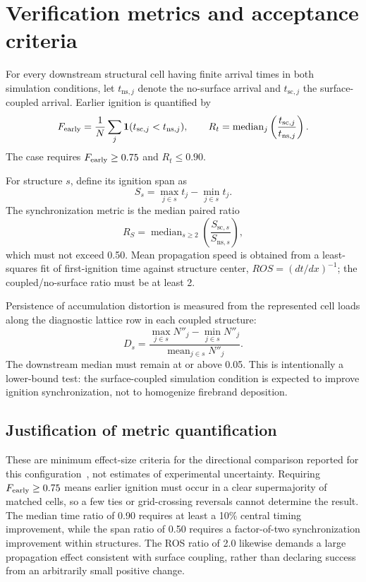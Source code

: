 \section{Verification metrics and acceptance criteria}

For every downstream structural cell having finite arrival times in both
simulation conditions, let \(t_{\mathrm{ns},j}\) denote the no-surface arrival and
\(t_{\mathrm{sc},j}\) the surface-coupled arrival. Earlier ignition is
quantified by
\[
  F_{\rm early}=\frac{1}{N}\sum_j
  \mathbf{1}(t_{\mathrm{sc},j}<t_{\mathrm{ns},j}),
  \qquad
  R_t=\operatorname{median}_j\left(
  \frac{t_{\mathrm{sc},j}}{t_{\mathrm{ns},j}}\right).
\]
The case requires \(F_{\rm early}\ge0.75\) and \(R_t\le0.90\).

For structure \(s\), define its ignition span as
\[
  S_s=\max_{j\in s}t_j-\min_{j\in s}t_j.
\]
The synchronization metric is the median paired ratio
\[
  R_S=\operatorname{median}_{s\ge2}
      \left(\frac{S_{\mathrm{sc},s}}{S_{\mathrm{ns},s}}\right),
\]
which must not exceed 0.50. Mean propagation speed is obtained from a
least-squares fit of first-ignition time against structure center,
\(ROS=(dt/dx)^{-1}\); the coupled/no-surface ratio must be at least 2.

Persistence of accumulation distortion is measured from the represented cell
loads along the diagnostic lattice row in each coupled structure:
\[
  D_s=\frac{\max_{j\in s}N''_j-\min_{j\in s}N''_j}
            {\operatorname{mean}_{j\in s}N''_j}.
\]
The downstream median must remain at or above 0.05. This is intentionally a
lower-bound test: the surface-coupled simulation condition is expected to improve ignition
synchronization,
not to homogenize firebrand deposition.

\subsection{Justification of metric quantification}

These are minimum effect-size criteria for the directional comparison reported
for this configuration~\cite{Qin2025}, not estimates of experimental
uncertainty.  Requiring \(F_{\rm early}\ge0.75\) means earlier ignition must
occur in a clear supermajority of matched cells, so a few ties or grid-crossing
reversals cannot determine the result.  The median time ratio of 0.90 requires
at least a 10\% central timing improvement, while the span ratio of 0.50
requires a factor-of-two synchronization improvement within structures.  The
ROS ratio of 2.0 likewise demands a large propagation effect consistent with
surface coupling, rather than declaring success from an arbitrarily small
positive change.

